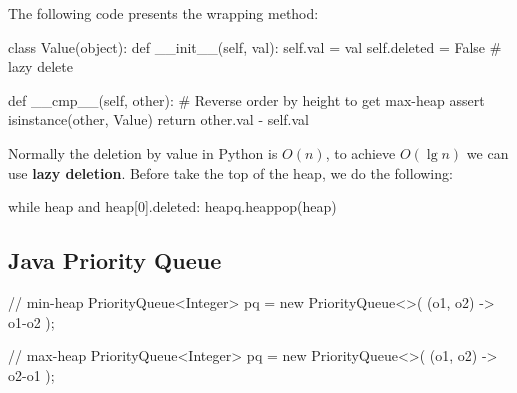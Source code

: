 The following code presents the wrapping method:
\begin{python}
class Value(object):
    def __init__(self, val):
        self.val = val
        self.deleted = False  # lazy delete 

    def __cmp__(self, other):
        # Reverse order by height to get max-heap
        assert isinstance(other, Value)
        return other.val - self.val
\end{python}

Normally the deletion by value in Python is $O(n)$, to achieve $O(\lg n)$ we can use \textbf{lazy deletion}. Before take the top of the heap, we do the following:
\begin{python}
while heap and heap[0].deleted:
    heapq.heappop(heap)
\end{python}
\subsection{Java Priority Queue}
\begin{java}
// min-heap
PriorityQueue<Integer> pq = new PriorityQueue<>(
    (o1, o2) -> o1-o2
);

// max-heap
PriorityQueue<Integer> pq = new PriorityQueue<>(
    (o1, o2) -> o2-o1
);
\end{java}
